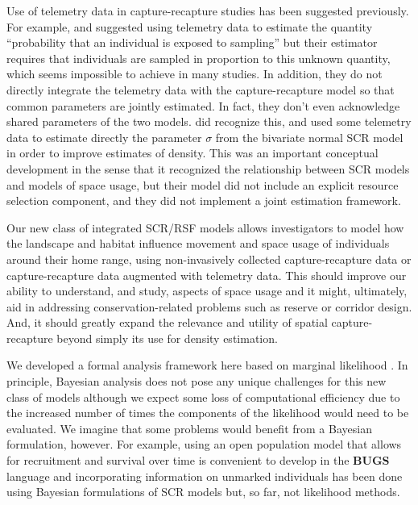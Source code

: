 \documentclass[12pt]{article}
\begin{document}
Use of telemetry data in capture-recapture studies has been suggested
previously. For example, \citet{white_shenk:2001} and
\citet{ivan:2012} suggested using telemetry data to estimate the
quantity ``probability that an individual is exposed to sampling'' but
their estimator requires that individuals are sampled in proportion to
this unknown quantity, which seems impossible to achieve in many
studies. In addition, they do not directly integrate the telemetry
data with the capture-recapture model so that common parameters are
jointly estimated. In fact, they don't even acknowledge shared
parameters of the two models.  \citet{sollmann_etal:inprep} did
recognize this, and used some telemetry data to estimate directly the
parameter $\sigma$ from the bivariate normal SCR model in order to
improve estimates of density. This was an important conceptual
development in the sense that it recognized the relationship between
SCR models and models of space usage, but their model did not include
an explicit resource selection component, and they did not implement a
joint estimation framework.

Our new class of integrated SCR/RSF models allows investigators to model how the landscape and
habitat influence movement and space usage of individuals around their
home range, using non-invasively collected capture-recapture data or
capture-recapture data augmented with telemetry data.  This should
improve our ability to understand, and study, aspects of space usage
and it might, ultimately, aid in addressing conservation-related
problems such as reserve or corridor design. And, it should greatly
expand the relevance and utility of spatial capture-recapture beyond
simply its use for density estimation.

We developed a formal analysis framework here based on marginal
likelihood \citep{borchers_efford:2008}.
In principle, Bayesian analysis does not pose any unique challenges
for this new class of models although we expect some loss of
computational efficiency due to the increased number of times the
components of the likelihood would need to be evaluated.  We imagine
that some problems would benefit from a Bayesian formulation,
however. For example, using an open population model that allows for
recruitment and survival over time \citep{gardner_etal:2010ecol} is
convenient to develop in the {\bf BUGS} language and incorporating
information on unmarked individuals has been done using Bayesian
formulations of SCR models \citep{chandler_royle:2012,
  sollmann_etal:inprep} but, so far, not likelihood methods.
\end{document}
